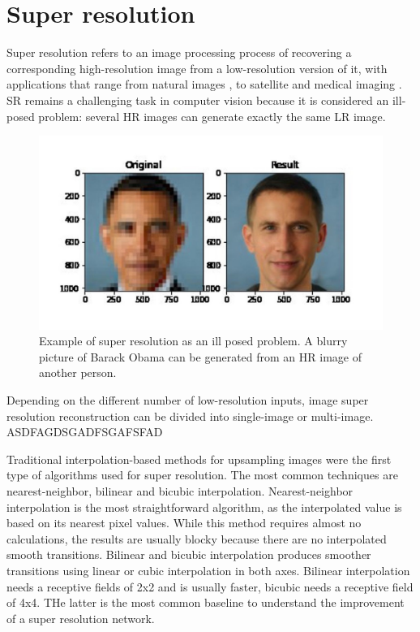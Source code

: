 \section{Super resolution} \label{sec:SR}

    Super resolution refers to an image processing process of recovering a corresponding high-resolution image from a low-resolution version of it, with applications that range from natural images \cite{zeyde2010single}, \cite{martin2001database} to satellite \cite{valsesia2021permutation} and medical imaging \cite{bashir2021comprehensive}. SR remains a challenging task in computer vision because it is considered an ill-posed problem: several HR images can generate exactly the same LR image. 

       \begin{figure}[h!]
            \centering
            \includegraphics[scale=0.2]{Includes/2-SR-ill-posed.jpg}
            \caption{Example of super resolution as an ill posed problem. A blurry picture of Barack Obama can be generated from an HR image of another person.}
            \label{fig:2-SR-ill-posed}
        \end{figure}
    
    Depending on the different number of low-resolution inputs, image super resolution reconstruction can be divided into single-image or multi-image. ASDFAGDSGADFSGAFSFAD

    Traditional interpolation-based methods for upsampling images were the first type of algorithms used for super resolution. The most common techniques are nearest-neighbor, bilinear and bicubic interpolation. Nearest-neighbor interpolation is the most straightforward algorithm, as the interpolated value is based on its nearest pixel values.  While this method requires almost no calculations, the results are usually blocky because there are no interpolated smooth transitions.
    Bilinear and bicubic interpolation produces smoother transitions using linear or cubic interpolation in both axes. Bilinear interpolation needs a receptive fields of 2x2 and is usually faster, bicubic needs a receptive field of 4x4. THe latter is the most common baseline to understand the improvement of a super resolution network. 

